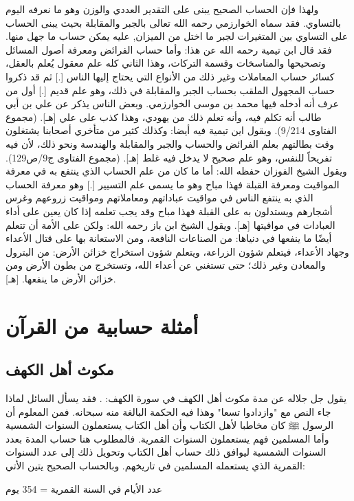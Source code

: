 ولهذا فإن الحساب الصحيح يبنى على التقدير العددي والوزن وهو ما نعرفه اليوم بالتساوي. فقد سماه الخوارزمي رحمه الله تعالى بالجبر والمقابلة بحيث يبنى الحساب على التساوي بين المتغيرات لجبر ما اختل من الميزان, عليه يمكن حساب ما جهل منها. فقد قال ابن تيمية رحمه الله عن هذا:
وأما حساب الفرائض ومعرفة أصول المسائل وتصحيحها والمناسخات وقسمة التركات، وهذا الثاني كله علم معقول يُعلم بالعقل، كسائر حساب المعاملات وغير ذلك من الأنواع التي يحتاج إليها الناس [.] ثم قد ذكروا حساب المجهول الملقب بحساب الجبر والمقابلة في ذلك، وهو علم قديم [.] أول من عرف أنه أدخله فيها محمد بن موسى الخوارزمي. وبعض الناس يذكر عن علي بن أبي طالب أنه تكلم فيه، وأنه تعلم ذلك من يهودي، وهذا كذب على علي
[هـ].
{\footnotesize (مجموع الفتاوى 9/214)}.
ويقول اين تيمية فيه أيضا:
وكذلك كثير من متأخري أصحابنا يشتغلون وقت بطالتهم بعلم الفرائض والحساب والجبر والمقابلة والهندسة ونحو ذلك، لأن فيه تفريحاً للنفس، وهو علم صحيح لا يدخل فيه غلط
[هـ].
{\footnotesize (مجموع الفتاوى ج9/ص129)}.
ويقول الشيخ الفوزان حفظه الله:
أما ما كان من علم الحساب الذي ينتفع به في معرفة المواقيت ومعرفة القبلة فهذا مباح وهو ما يسمى علم التسيير [.] وهو معرفة الحساب الذي به ينتفع الناس في مواقيت عباداتهم ومعاملاتهم ومواقيت زروعهم وغرس أشجارهم ويستدلون به على القبلة فهذا مباح وقد يجب تعلمه إذا كان يعين على أداء العبادات في مواقيتها [هـ].
ويقول الشيخ ابن باز رحمه الله: 
ولكن على الأمة أن تتعلم أيضًا ما ينفعها في دنياها: من الصناعات النافعة، ومن الاستعانة بها على قتال الأعداء وجهاد الأعداء، فيتعلم شؤون الزراعة، ويتعلم شؤون استخراج خزائن الأرض: من البترول والمعادن وغير ذلك؛ حتى تستغني عن أعداء الله، وتستخرج من بطون الأرض ومن خزائن الأرض ما ينفعها.
[هـ].

\section{أمثلة حسابية من القرآن}
\subsection{مكوث أهل الكهف}
يقول جل جلاله عن مدة مكوث أهل الكهف في سورة الكهف:
\quranayah*[18][25]{\footnotesize \surahname*[18]}. فقد يسأل السائل لماذا جاء النص مع "وازدادوا تسعا" وهذا فيه الحكمة البالغة منه سبحانه. فمن المعلوم أن الرسول ﷺ كان مخاطبا لأهل الكتاب وأن أهل الكتاب يستعملون السنوات الشمسية وأما المسلمين فهم يستعملون السنوات القمرية. فالمطلوب هنا حساب المدة بعدد السنوات الشمسية ليوافق ذلك حساب أهل الكتاب وتحويل ذلك إلى عدد السنوات القمرية الذي يستعمله المسلمين في تاريخهم. وبالحساب الصحيح يتين الأتي:

عدد الأيام في السنة القمرية = 354 يوم


